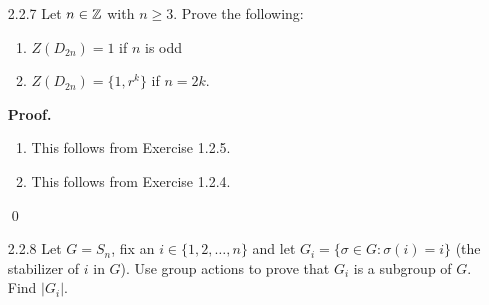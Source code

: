 \begin{enumerate}
      \begin{enumerate}
         \item To show that $H$ is a subgroup of $N_G(H)$, it suffices to show
               that $H$ is a subset of $N_G(H)$. So let $x \in H$. Clearly
               $xHx^{-1} \subseteq H$ because $H$ is closed under
               multiplication. Now let $y \in H$, so that
               $x^{-1}yx \in H$. Since
               $$x(x^{-1}yx)x^{-1} = y,$$
               it follows that $y \in xHx^{-1}$; that is,
               $H \subseteq xHx^{-1}$, and thus, $H = xHx^{-1}$. We
               have thus shown that $x \in N_G(H)$. Thus $H \le N_G(H)$. \\

               \textbf{Example.} Let $G = D_6$ and $H = \{r, s\}$. Note that
               $H$ is not a subgroup of $G$ and $H$ is not a subset of
               $N_G(H) = \{1\}$.
         \item ($\Rightarrow$) Suppose that $H \le C_G(H)$. Let $x$, $y \in H$. 
               By our supposition, it follows that $x \in C_G(H)$, so that
               $xy = yx$; since $x$ and $y$ were arbitrarily chosen, it follows 
               that $H$ is abelian.

               ($\Leftarrow$) Suppose conversely that $H$ is abelian. That is,
               every element of $H$ commutes with all elements of $H$, so it
               follows immediately that $H \le C_G(H)$.
      \end{enumerate} \qed
   \item[2.2.7]   Let $n \in \mathbb{Z}$ with $n \ge 3$. Prove the following:
                  \begin{enumerate}
                     \item $Z(D_{2n}) = 1$ if $n$ is odd
                     \item $Z(D_{2n}) = \{1, r^k\}$ if $n = 2k$.
                  \end{enumerate}

      \textbf{Proof.}

      \begin{enumerate}
         \item This follows from Exercise 1.2.5.
         \item This follows from Exercise 1.2.4.
      \end{enumerate} \qed
   \item[2.2.8]   Let $G = S_n$, fix an $i \in \{1, 2, \ldots, n\}$ and let
                  $G_i = \{\sigma \in G : \sigma(i) = i\}$ (the stabilizer of
                  $i$ in $G$). Use group actions to prove that $G_i$ is a
                  subgroup of $G$. Find $|G_i|$.


\end{enumerate}
